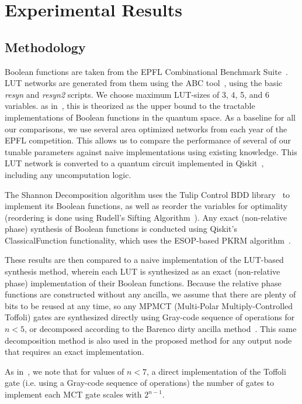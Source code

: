\section{Experimental Results}
\label{Sec:exp}
\subsection{Methodology}

Boolean functions are taken from the EPFL Combinational Benchmark Suite~\cite{bib-epfl}. LUT networks are generated from them using the ABC tool~\cite{bib-abc}, using the basic \emph{resyn} and \emph{resyn2} scripts. We choose maximum LUT-sizes of 3, 4, 5, and 6 variables. as in~\cite{bib-barenco-elementary}, this is theorized as the upper bound to the tractable implementations of Boolean functions in the quantum space. As a baseline for all our comparisons, we use several area optimized networks from each year of the EPFL competition. This allows us to compare the performance of several of our tunable parameters against naive implementations using existing knowledge. This LUT network is converted to a quantum circuit implemented in Qiskit~\cite{bib-qiskit}, including any uncomputation logic. 

The Shannon Decomposition algorithm uses the Tulip Control BDD library~\cite{bib-tulip-dd} to implement its Boolean functions, as well as reorder the variables for optimality (reordering is done using Rudell's Sifting Algorithm~\cite{bib-rudell}). Any exact (non-relative phase) synthesis of Boolean functions is conducted using Qiskit's ClassicalFunction functionality, which uses the ESOP-based PKRM algorithm~\cite{bib-pkrm}.

These results are then compared to a naive implementation of the LUT-based synthesis method, wherein each LUT is synthesized as an exact (non-relative phase) implementation of their Boolean functions. Because the relative phase functions are constructed without any ancilla, we assume that there are plenty of bits to be reused at any time, so any MPMCT (Multi-Polar Multiply-Controlled Toffoli) gates are synthesized directly using Gray-code sequence of operations for $n<5$, or decomposed according to the Barenco dirty ancilla method~\cite{bib-barenco-elementary}. This same decomposition method is also used in the proposed method for any output node that requires an exact implementation.

As in~\cite{bib-barenco-elementary}, we note that for values of $n<7$, a direct implementation of the Toffoli gate (i.e. using a Gray-code sequence of operations) the number of gates to implement each MCT gate scales with $2^{n-1}$.

